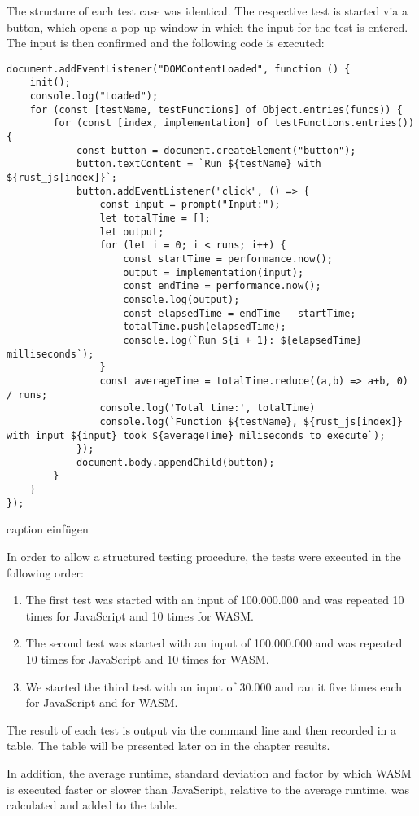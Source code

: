 The structure of each test case was identical. The respective test is started via a button, which opens a pop-up window in which the input for the test is entered. The input is then confirmed and the following code is executed:
\begin{verbatim}
document.addEventListener("DOMContentLoaded", function () {
    init();
    console.log("Loaded");
    for (const [testName, testFunctions] of Object.entries(funcs)) {
        for (const [index, implementation] of testFunctions.entries()) {
            const button = document.createElement("button");
            button.textContent = `Run ${testName} with ${rust_js[index]}`;
            button.addEventListener("click", () => {
                const input = prompt("Input:");
                let totalTime = [];
                let output;
                for (let i = 0; i < runs; i++) {
                    const startTime = performance.now();
                    output = implementation(input);
                    const endTime = performance.now();
                    console.log(output);
                    const elapsedTime = endTime - startTime;
                    totalTime.push(elapsedTime);
                    console.log(`Run ${i + 1}: ${elapsedTime} milliseconds`);
                }
                const averageTime = totalTime.reduce((a,b) => a+b, 0) / runs;
                console.log('Total time:', totalTime)
                console.log(`Function ${testName}, ${rust_js[index]} with input ${input} took ${averageTime} miliseconds to execute`);
            });
            document.body.appendChild(button);
        }
    }
});
\end{verbatim}
caption einfügen

In order to allow a structured testing procedure, the tests were executed in the following order:
\begin{enumerate}
\item The first test was started with an input of 100.000.000 and was repeated 10 times for JavaScript and 10 times for WASM.
\item The second test was started with an input of 100.000.000 and was repeated 10 times for JavaScript and 10 times for WASM.
\item We started the third test with an input of 30.000 and ran it five times each for JavaScript and for WASM.
\end{enumerate}
The result of each test is output via the command line and then recorded in a table. The table will be presented later on in the chapter results.

In addition, the average runtime, standard deviation and factor by which WASM is executed faster or slower than JavaScript, relative to the average runtime, was calculated and added to the table.